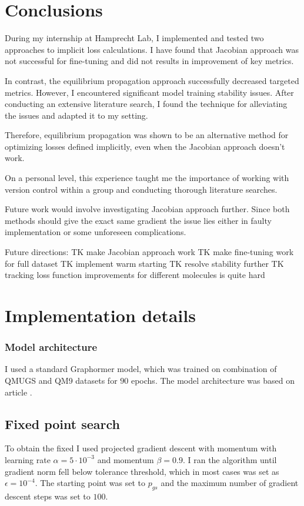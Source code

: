 \documentclass[a4paper,10pt]{report}
\begin{document}
\clearpage
\section{Conclusions}
During my internship at Hamprecht Lab, I implemented and tested two approaches to implicit loss calculations. I have found that Jacobian approach was not successful for fine-tuning and did not results in improvement of key metrics.

In contrast, the equilibrium propagation approach successfully decreased targeted metrics. However, I encountered significant model training stability issues. After conducting an extensive literature search, I found the technique for alleviating the issues and adapted it to my setting.

Therefore, equilibrium propagation was shown to be an alternative method for optimizing losses defined implicitly, even when the Jacobian approach doesn't work.

On a personal level, this experience taught me the importance of working with version control within a group and conducting thorough literature searches.

Future work would involve investigating Jacobian approach further. Since both methods should give the exact same gradient the issue lies either in faulty implementation or some unforeseen complications.


Future directions:
TK make Jacobian approach work
TK make fine-tuning work for full dataset
TK implement warm starting
TK resolve stability further
TK tracking loss function improvements for different molecules is quite hard
\nocite{*}





\appendix
\section{Implementation details} \label{sec:impl}

\subsubsection{Model architecture}
I used a standard Graphormer model, which was trained on combination of QMUGS and QM9 datasets for $90$ epochs. The model architecture was based on article \cite{zhang2024overcoming}.

\subsection{Fixed point search}
To obtain the fixed I used projected gradient descent with momentum with learning rate $\alpha = 5\cdot 10^{-3}$ and momentum $\beta = 0.9$. I ran the algorithm until gradient norm fell below tolerance threshold, which in most cases was set as $\epsilon = 10^{-4}$. The starting point was set to $p_{gs}$ and the maximum number of gradient descent steps was set to $100$.
\end{document}
